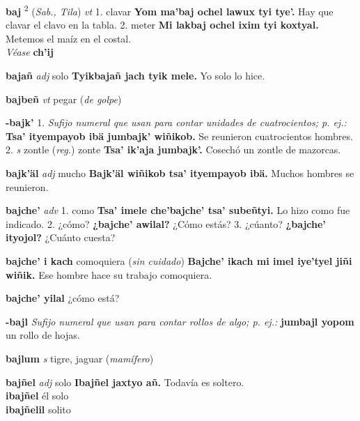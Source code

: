 \documentclass[10pt]{scrbook}
\newcommand{\entry}[1]{\textbf{#1}}
\newcommand{\onedefinition}[1]{#1.}
\newcommand{\defsuperscript}[1]{\textsuperscript{#1}}
\newcommand{\nontranslationdef}[1]{\textit{#1}}
\newcommand{\partofspeech}[1]{\textit{#1}}
\newcommand{\spanishtranslation}[1]{#1}
\newcommand{\clarification}[1]{(\textit{#1})}
\newcommand{\cholexample}[1]{\textbf{#1}}
\newcommand{\exampletranslation}[1]{#1}
\newcommand{\alsosee}[1]{\\\textit{Véase} \textbf{#1}}
\newcommand{\relevantdialect}[1]{(\textit{#1})}
\newcommand{\secondaryentry}[1]{\\\textbf{#1}}
\newcommand{\secondtranslation}[1]{#1}
\begin{document}
\begin{multicols}{2}
\entry{baj}
\defsuperscript{2}
\relevantdialect{Sab., Tila}
\partofspeech{vt}
\onedefinition{1}
\spanishtranslation{clavar}
\cholexample{Yom ma'baj ochel lawux tyi tye'.}
\exampletranslation{Hay que clavar el clavo en la tabla.}
\onedefinition{2}
\spanishtranslation{meter}
\cholexample{Mi lakbaj ochel ixim tyi koxtyal.}
\exampletranslation{Metemos el maíz en el costal.}
\alsosee{ch'ij}

\entry{bajañ}
\partofspeech{adj}
\spanishtranslation{solo}
\cholexample{Tyikbajañ jach tyik mele.}
\exampletranslation{Yo solo lo hice.}

\entry{bajbeñ}
\partofspeech{vt}
\spanishtranslation{pegar}
\clarification{de golpe}

\entry{-bajk'}
\onedefinition{1}
\nontranslationdef{Sufijo numeral que usan para contar unidades de cuatrocientos; p. ej.:}
\cholexample{Tsa' ityempayob ibä jumbajk' wiñikob.}
\exampletranslation{Se reunieron cuatrocientos hombres.}
\onedefinition{2}
\partofspeech{s}
\spanishtranslation{zontle}
\clarification{reg.}
\spanishtranslation{zonte}
\cholexample{Tsa' ik'aja jumbajk'.}
\exampletranslation{Cosechó un zontle de mazorcas.}

\entry{bajk'äl}
\partofspeech{adj}
\spanishtranslation{mucho}
\cholexample{Bajk'äl wiñikob tsa' ityempayob ibä.}
\exampletranslation{Muchos hombres se reunieron.}

\entry{bajche'}
\partofspeech{adv}
\onedefinition{1}
\spanishtranslation{como}
\cholexample{Tsa' imele che'bajche' tsa' subeñtyi.}
\exampletranslation{Lo hizo como fue indicado.}
\onedefinition{2}
\spanishtranslation{¿cómo?}
\cholexample{¿bajche' awilal?}
\exampletranslation{¿Cómo estás?}
\onedefinition{3}
\spanishtranslation{¿cúanto?}
\cholexample{¿bajche' ityojol?}
\exampletranslation{¿Cuánto cuesta?}

\entry{bajche' i kach}
\spanishtranslation{comoquiera}
\clarification{sin cuidado}
\cholexample{Bajche' ikach mi imel iye'tyel jiñi wiñik.}
\exampletranslation{Ese hombre hace su trabajo comoquiera.}

\entry{bajche' yilal}
\spanishtranslation{¿cómo está?}

\entry{-bajl}
\nontranslationdef{Sufijo numeral que usan para contar rollos de algo; p. ej.:}
\cholexample{jumbajl yopom}
\exampletranslation{un rollo de hojas.}

\entry{bajlum}
\partofspeech{s}
\spanishtranslation{tigre, jaguar}
\clarification{mamífero}

\entry{bajñel}
\partofspeech{adj}
\spanishtranslation{solo}
\cholexample{Ibajñel jaxtyo añ.}
\exampletranslation{Todavía es soltero.}
\secondaryentry{ibajñel}
\secondtranslation{él solo}
\secondaryentry{ibajñelil}
\secondtranslation{solito}


\end{multicols}
\end{document}
